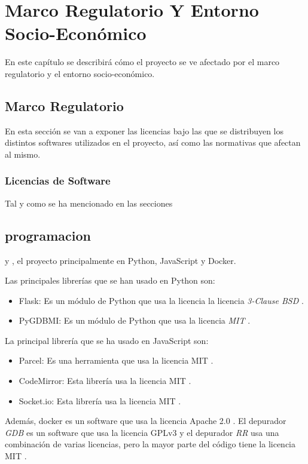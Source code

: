 \chapter{Marco Regulatorio Y Entorno Socio-Económico}\label{chap:marco-regulador}

En este capítulo se describirá cómo el proyecto se ve afectado por el marco regulatorio y el entorno socio-económico.

\section{Marco Regulatorio}\label{sec:marco-regulador}

En esta sección se van a exponer las licencias bajo las que se distribuyen los distintos softwares utilizados en el proyecto, así como las normativas que afectan al mismo. 

\subsection{Licencias de Software}\label{subsec:licencias-software}

Tal y como se ha mencionado en las secciones \section{programacion} y , el proyecto principalmente en Python, JavaScript y Docker.

Las principales librerías que se han usado en Python son:
\begin{itemize}
    \item Flask: Es un módulo de Python que usa la licencia la licencia \textit{3-Clause BSD} \cite{flask}.
    \item PyGDBMI: Es un módulo de Python que usa la licencia \textit{MIT} \cite{pygdbmi}.
\end{itemize}

La principal librería que se ha usado en JavaScript son:
\begin{itemize}
    \item Parcel: Es una herramienta que usa la licencia MIT \cite{parcel}.
    \item CodeMirror: Esta librería usa la licencia MIT \cite{codemirror}. 
    \item Socket.io: Esta librería usa la licencia MIT \cite{socket.io}.
\end{itemize}

Además, docker es un software que usa la licencia Apache 2.0 \cite{docker}. El depurador \textit{GDB} es un software que usa la licencia GPLv3 \cite{GDB} y el depurador \textit{RR} usa una combinación de varias licencias, pero la mayor parte del código tiene la licencia MIT \cite{RR-Github}.

